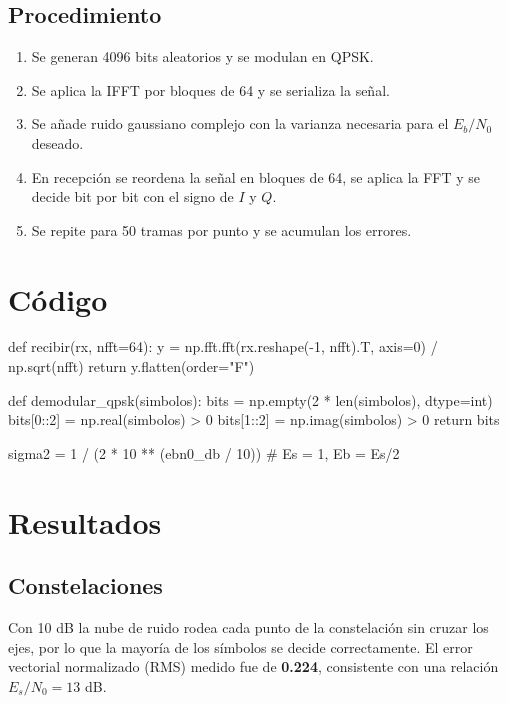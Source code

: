 \documentclass[11pt,a4paper]{article}
\begin{document}
\subsection{Procedimiento}

\begin{enumerate}
  \item Se generan 4096 bits aleatorios y se modulan en QPSK.
  \item Se aplica la IFFT por bloques de 64 y se serializa la señal.
  \item Se añade ruido gaussiano complejo con la varianza necesaria para el $E_b/N_0$
        deseado.
  \item En recepción se reordena la señal en bloques de 64, se aplica la FFT y se decide
        bit por bit con el signo de $I$ y $Q$.
  \item Se repite para 50 tramas por punto y se acumulan los errores.
\end{enumerate}

\section{Código}

\begin{codigo}
def recibir(rx, nfft=64):
    y = np.fft.fft(rx.reshape(-1, nfft).T, axis=0) / np.sqrt(nfft)
    return y.flatten(order="F")

def demodular_qpsk(simbolos):
    bits = np.empty(2 * len(simbolos), dtype=int)
    bits[0::2] = np.real(simbolos) > 0
    bits[1::2] = np.imag(simbolos) > 0
    return bits

sigma2 = 1 / (2 * 10 ** (ebn0_db / 10))   # Es = 1, Eb = Es/2
\end{codigo}

\section{Resultados}

\subsection{Constelaciones}


Con 10 dB la nube de ruido rodea cada punto de la constelación sin cruzar los ejes, por lo
que la mayoría de los símbolos se decide correctamente. El error vectorial normalizado
(RMS) medido fue de \textbf{0.224}, consistente con una relación $E_s/N_0=13$ dB.
\end{document}
